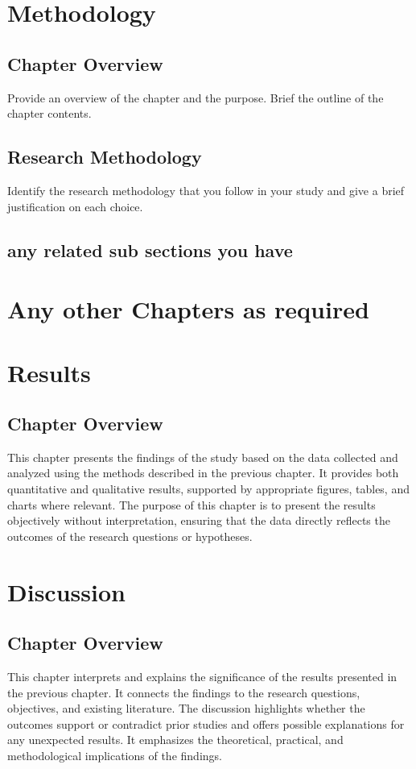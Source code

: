 \documentclass[12pt,a4paper]{report}
\begin{document}
\chapter{Methodology}
\section{Chapter Overview}
Provide an overview of the chapter and the purpose. Brief the outline of the chapter contents.

\section{Research Methodology}

Identify the research methodology that you follow in your study and give a brief justification on each choice. 

\section{any related sub sections you have}

\chapter{Any other Chapters as required}

\chapter{Results}

\section{Chapter Overview}
This chapter presents the findings of the study based on the data collected and analyzed using the methods described in the previous chapter. 
It provides both quantitative and qualitative results, supported by appropriate figures, tables, and charts where relevant. 
The purpose of this chapter is to present the results objectively without interpretation, ensuring that the data directly reflects the outcomes of the research questions or hypotheses.


\chapter{Discussion}

\section{Chapter Overview}
This chapter interprets and explains the significance of the results presented in the previous chapter. 
It connects the findings to the research questions, objectives, and existing literature. 
The discussion highlights whether the outcomes support or contradict prior studies and offers possible explanations for any unexpected results. 
It emphasizes the theoretical, practical, and methodological implications of the findings.
\end{document}
